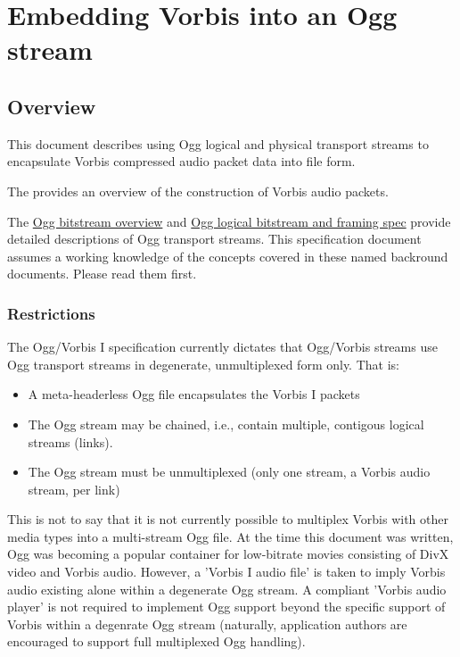 \section{Embedding Vorbis into an Ogg stream} \label{vorbis:over:ogg}

\subsection{Overview}

This document describes using Ogg logical and physical transport
streams to encapsulate Vorbis compressed audio packet data into file
form.

The  provides an overview of the construction
of Vorbis audio packets.

The \href{oggstream.html}{Ogg
bitstream overview} and \href{framing.html}{Ogg logical
bitstream and framing spec} provide detailed descriptions of Ogg
transport streams. This specification document assumes a working
knowledge of the concepts covered in these named backround
documents.  Please read them first.

\subsubsection{Restrictions}

The Ogg/Vorbis I specification currently dictates that Ogg/Vorbis
streams use Ogg transport streams in degenerate, unmultiplexed
form only. That is:

\begin{itemize}
 \item
  A meta-headerless Ogg file encapsulates the Vorbis I packets

 \item
  The Ogg stream may be chained, i.e., contain multiple, contigous logical streams (links).

 \item
  The Ogg stream must be unmultiplexed (only one stream, a Vorbis audio stream, per link)

\end{itemize}


This is not to say that it is not currently possible to multiplex
Vorbis with other media types into a multi-stream Ogg file.  At the
time this document was written, Ogg was becoming a popular container
for low-bitrate movies consisting of DivX video and Vorbis audio.
However, a 'Vorbis I audio file' is taken to imply Vorbis audio
existing alone within a degenerate Ogg stream.  A compliant 'Vorbis
audio player' is not required to implement Ogg support beyond the
specific support of Vorbis within a degenrate Ogg stream (naturally,
application authors are encouraged to support full multiplexed Ogg
handling).




